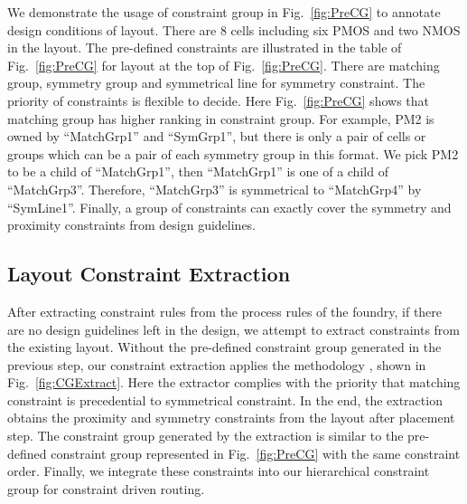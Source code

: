     
      We demonstrate the usage of constraint group in Fig.~\ref{fig:PreCG} to annotate design conditions of layout. There are 8 cells including six PMOS and two NMOS in the layout. The pre-defined constraints are illustrated in the table of Fig.~\ref{fig:PreCG} for layout at the top of Fig.~\ref{fig:PreCG}. There are matching group, symmetry group and symmetrical line for symmetry constraint. The priority of constraints is flexible to decide. Here Fig.~\ref{fig:PreCG} shows that matching group has higher ranking in constraint group. For example, PM2 is owned by ``MatchGrp1'' and ``SymGrp1'', but there is only a pair of cells or groups which can be a pair of each symmetry group in this format. We pick PM2 to be a child of  ``MatchGrp1'', then ``MatchGrp1'' is one of a child of ``MatchGrp3''. Therefore, ``MatchGrp3'' is symmetrical to ``MatchGrp4'' by ``SymLine1''. Finally, a group of constraints can exactly cover the symmetry and proximity constraints from design guidelines.


    \subsection{Layout Constraint Extraction}\label{sec:LayoutConExt}
      After extracting constraint rules from the process rules of the foundry, if there are no design guidelines left in the design, we attempt to extract constraints from the existing layout. Without the pre-defined constraint group generated in the previous step, our constraint extraction applies the methodology \cite{srm-massier-tcad08,palpndg-iccad2011}, shown in Fig.~\ref{fig:CGExtract}. Here the extractor complies with the priority that matching constraint is precedential to symmetrical constraint. In the end, the extraction obtains the proximity and symmetry constraints from the layout after placement step. The constraint group generated by the extraction is similar to the pre-defined constraint group represented in Fig.~\ref{fig:PreCG} with the same constraint order. Finally, we integrate these constraints into our hierarchical constraint group for constraint driven routing.
    

